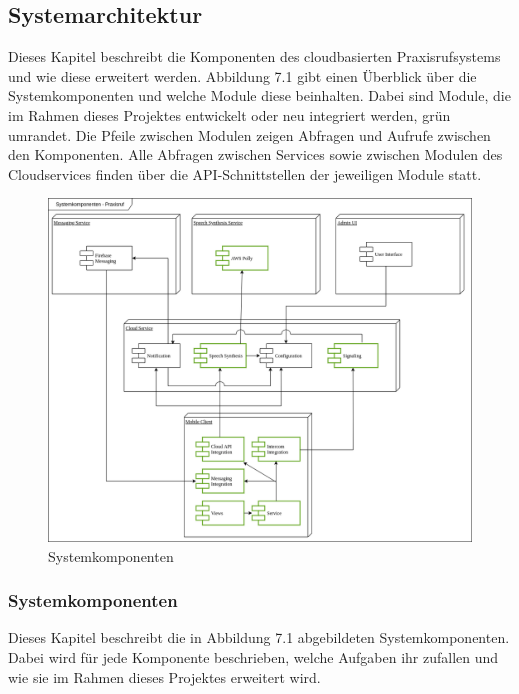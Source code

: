 \subsection{Systemarchitektur}

Dieses Kapitel beschreibt die Komponenten des cloudbasierten Praxisrufsystems und wie diese erweitert werden.
Abbildung 7.1 gibt einen Überblick über die Systemkomponenten und welche Module diese beinhalten.
Dabei sind Module, die im Rahmen dieses Projektes entwickelt oder neu integriert werden, grün umrandet.
Die Pfeile zwischen Modulen zeigen Abfragen und Aufrufe zwischen den Komponenten.
Alle Abfragen zwischen Services sowie zwischen Modulen des Cloudservices finden über die API-Schnittstellen der jeweiligen Module statt.

\begin{figure}[h]
    \centering
    \begin{minipage}[b]{0.75\textwidth}
        \includegraphics[width=\textwidth]{graphics/diagramms/Component_System_V03}
        \caption{Systemkomponenten}
    \end{minipage}
\end{figure}

\subsubsection{Systemkomponenten}

Dieses Kapitel beschreibt die in Abbildung 7.1 abgebildeten Systemkomponenten.
Dabei wird für jede Komponente beschrieben, welche Aufgaben ihr zufallen und wie sie im Rahmen dieses Projektes erweitert wird.

